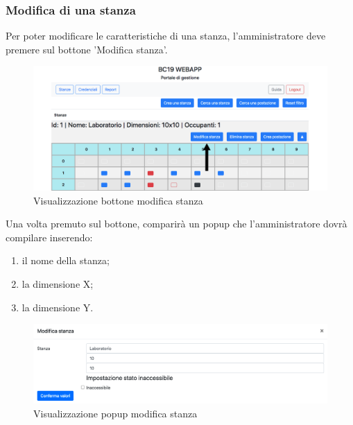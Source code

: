 \subsubsection{Modifica di una stanza}
Per poter modificare le caratteristiche di una stanza, l'amministratore deve premere sul bottone 'Modifica stanza'.
\begin{figure}[H]
	\centering
	\includegraphics[width=15cm]{res/images/bottoneEditRoom.png}
	\caption{Visualizzazione bottone modifica stanza}
\end{figure}
Una volta premuto sul bottone, comparirà un popup che l'amministratore dovrà compilare inserendo:
\begin{enumerate}
	\item il nome della stanza;
	\item la dimensione X;
	\item la dimensione Y.
\end{enumerate}
\begin{figure}[H]
	\centering
	\includegraphics[width=15cm]{res/images/modificaStanza.png}
	\caption{Visualizzazione popup modifica stanza}
\end{figure}

